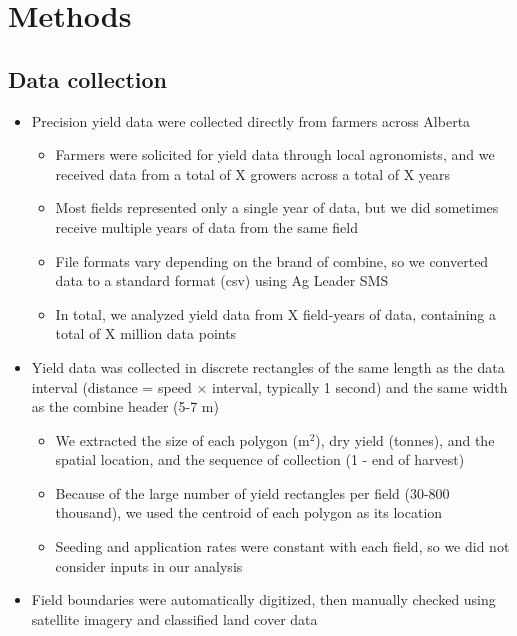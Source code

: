 \documentclass[]{elsarticle} %
\providecommand{\tightlist}{%
  \setlength{\itemsep}{0pt}\setlength{\parskip}{0pt}}
\begin{document}
\hypertarget{methods}{%
\section{Methods}\label{methods}}

\hypertarget{data-collection}{%
\subsection{Data collection}\label{data-collection}}

\begin{itemize}
\tightlist
\item
  Precision yield data were collected directly from farmers across Alberta

  \begin{itemize}
  \tightlist
  \item
    Farmers were solicited for yield data through local agronomists, and we received data from a total of X growers across a total of X years
  \item
    Most fields represented only a single year of data, but we did sometimes receive multiple years of data from the same field
  \item
    File formats vary depending on the brand of combine, so we converted data to a standard format (csv) using Ag Leader SMS
  \item
    In total, we analyzed yield data from X field-years of data, containing a total of X million data points
  \end{itemize}
\item
  Yield data was collected in discrete rectangles of the same length as the data interval (distance = speed \(\times\) interval, typically 1 second) and the same width as the combine header (5-7 m)

  \begin{itemize}
  \tightlist
  \item
    We extracted the size of each polygon (m\(^2\)), dry yield (tonnes), and the spatial location, and the sequence of collection (1 - end of harvest)
  \item
    Because of the large number of yield rectangles per field (30-800 thousand), we used the centroid of each polygon as its location
  \item
    Seeding and application rates were constant with each field, so we did not consider inputs in our analysis
  \end{itemize}
\item
  Field boundaries were automatically digitized, then manually checked using satellite imagery and classified land cover data


\end{itemize}
\end{document}
